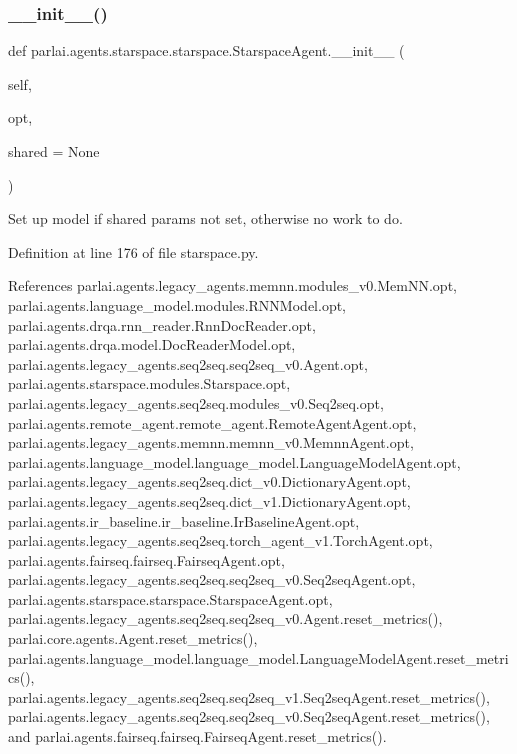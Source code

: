 \subsubsection{\texorpdfstring{\+\_\+\+\_\+init\+\_\+\+\_\+()}{\_\_init\_\_()}}
{\footnotesize\ttfamily def parlai.\+agents.\+starspace.\+starspace.\+Starspace\+Agent.\+\_\+\+\_\+init\+\_\+\+\_\+ (\begin{DoxyParamCaption}\item[{}]{self,  }\item[{}]{opt,  }\item[{}]{shared = {\ttfamily None} }\end{DoxyParamCaption})}

\begin{DoxyVerb}Set up model if shared params not set, otherwise no work to do.\end{DoxyVerb}
 

Definition at line 176 of file starspace.\+py.



References parlai.\+agents.\+legacy\+\_\+agents.\+memnn.\+modules\+\_\+v0.\+Mem\+N\+N.\+opt, parlai.\+agents.\+language\+\_\+model.\+modules.\+R\+N\+N\+Model.\+opt, parlai.\+agents.\+drqa.\+rnn\+\_\+reader.\+Rnn\+Doc\+Reader.\+opt, parlai.\+agents.\+drqa.\+model.\+Doc\+Reader\+Model.\+opt, parlai.\+agents.\+legacy\+\_\+agents.\+seq2seq.\+seq2seq\+\_\+v0.\+Agent.\+opt, parlai.\+agents.\+starspace.\+modules.\+Starspace.\+opt, parlai.\+agents.\+legacy\+\_\+agents.\+seq2seq.\+modules\+\_\+v0.\+Seq2seq.\+opt, parlai.\+agents.\+remote\+\_\+agent.\+remote\+\_\+agent.\+Remote\+Agent\+Agent.\+opt, parlai.\+agents.\+legacy\+\_\+agents.\+memnn.\+memnn\+\_\+v0.\+Memnn\+Agent.\+opt, parlai.\+agents.\+language\+\_\+model.\+language\+\_\+model.\+Language\+Model\+Agent.\+opt, parlai.\+agents.\+legacy\+\_\+agents.\+seq2seq.\+dict\+\_\+v0.\+Dictionary\+Agent.\+opt, parlai.\+agents.\+legacy\+\_\+agents.\+seq2seq.\+dict\+\_\+v1.\+Dictionary\+Agent.\+opt, parlai.\+agents.\+ir\+\_\+baseline.\+ir\+\_\+baseline.\+Ir\+Baseline\+Agent.\+opt, parlai.\+agents.\+legacy\+\_\+agents.\+seq2seq.\+torch\+\_\+agent\+\_\+v1.\+Torch\+Agent.\+opt, parlai.\+agents.\+fairseq.\+fairseq.\+Fairseq\+Agent.\+opt, parlai.\+agents.\+legacy\+\_\+agents.\+seq2seq.\+seq2seq\+\_\+v0.\+Seq2seq\+Agent.\+opt, parlai.\+agents.\+starspace.\+starspace.\+Starspace\+Agent.\+opt, parlai.\+agents.\+legacy\+\_\+agents.\+seq2seq.\+seq2seq\+\_\+v0.\+Agent.\+reset\+\_\+metrics(), parlai.\+core.\+agents.\+Agent.\+reset\+\_\+metrics(), parlai.\+agents.\+language\+\_\+model.\+language\+\_\+model.\+Language\+Model\+Agent.\+reset\+\_\+metrics(), parlai.\+agents.\+legacy\+\_\+agents.\+seq2seq.\+seq2seq\+\_\+v1.\+Seq2seq\+Agent.\+reset\+\_\+metrics(), parlai.\+agents.\+legacy\+\_\+agents.\+seq2seq.\+seq2seq\+\_\+v0.\+Seq2seq\+Agent.\+reset\+\_\+metrics(), and parlai.\+agents.\+fairseq.\+fairseq.\+Fairseq\+Agent.\+reset\+\_\+metrics().

